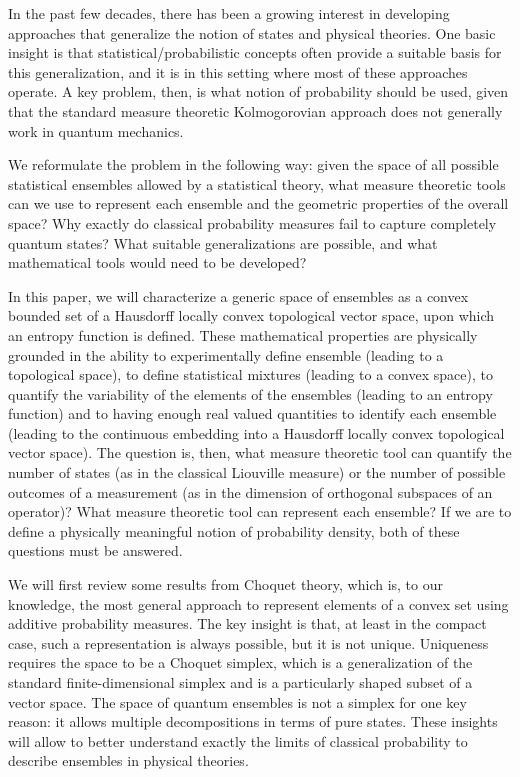 \documentclass[10pt,twocolumn, nofootinbib]{revtex4-2}
\begin{document}
In the past few decades, there has been a growing interest in developing approaches that generalize the notion of states and physical theories. One basic insight is that statistical/probabilistic concepts often provide a suitable basis for this generalization, and it is in this setting where most of these approaches operate. A key problem, then, is what notion of probability should be used, given that the standard measure theoretic Kolmogorovian approach does not generally work in quantum mechanics.

We reformulate the problem in the following way: given the space of all possible statistical ensembles allowed by a statistical theory, what measure theoretic tools can we use to represent each ensemble and the geometric properties of the overall space? Why exactly do classical probability measures fail to capture completely quantum states? What suitable generalizations are possible, and what mathematical tools would need to be developed?

In this paper, we will characterize a generic space of ensembles as a convex bounded set of a Hausdorff locally convex topological vector space, upon which an entropy function is defined. These mathematical properties are physically grounded in the ability to experimentally define ensemble (leading to a topological space), to define statistical mixtures (leading to a convex space), to quantify the variability of the elements of the ensembles (leading to an entropy function) and to having enough real valued quantities to identify each ensemble (leading to the continuous embedding into a Hausdorff locally convex topological vector space). The question is, then, what measure theoretic tool can quantify the number of states (as in the classical Liouville measure) or the number of possible outcomes of a measurement (as in the dimension of orthogonal subspaces of an operator)? What measure theoretic tool can represent each ensemble? If we are to define a physically meaningful notion of probability density, both of these questions must be answered.

We will first review some results from Choquet theory, which is, to our knowledge, the most general approach to represent elements of a convex set using additive probability measures. The key insight is that, at least in the compact case, such a representation is always possible, but it is not unique. Uniqueness requires the space to be a Choquet simplex, which is a generalization of the standard finite-dimensional simplex and is a particularly shaped subset of a vector space. The space of quantum ensembles is not a simplex for one key reason: it allows multiple decompositions in terms of pure states. These insights will allow to better understand exactly the limits of classical probability to describe ensembles in physical theories.
\end{document}
